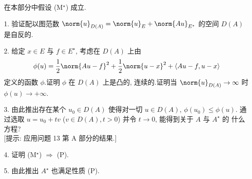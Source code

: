 \begin{problem}[第 2, 3 章]

在本部分中假设 (M$^\star$) 成立.

1. 验证配以图范数 $\norm{u}_{D(A)}=\norm{u}_E+\norm{Au}_{E^\star}$ 的空间 $D(A)$
是自反的.

2. 给定 $x\in E$ 与 $f\in E^\star$, 考虑在 $D(A)$ 上由
\begin{equation*}
\phi(u)=\frac12\norm{Au-f}^2+\frac12\norm{u-x}^2+\dual{Au-f}{u-x}
\end{equation*}
定义的函数 $\phi$.证明 $\phi$ 在 $D(A)$ 上是凸的, 连续的.证明当 $\norm{u}_{D(A)}\to\infty$
时 $\phi(u)\to+\infty$.

3. 由此推出存在某个 $u_0\in D(A)$ 使得对一切 $u\in D(A)$, $\phi(u_0)\le\phi(u)$.
通过选取 $u=u_0+tv$ ($v\in D(A),t>0$) 并令 $t\to0$, 能得到关于 $A$ 与 $A^\star$ 的
什么方程? \\
{[提示: 应用问题 13 第 A 部分的结果.]}

4. 证明 (M$^\star$) $\Rightarrow$ (P).

5. 由此推出 $A^\star$ 也满足性质 (P).
\end{problem}


